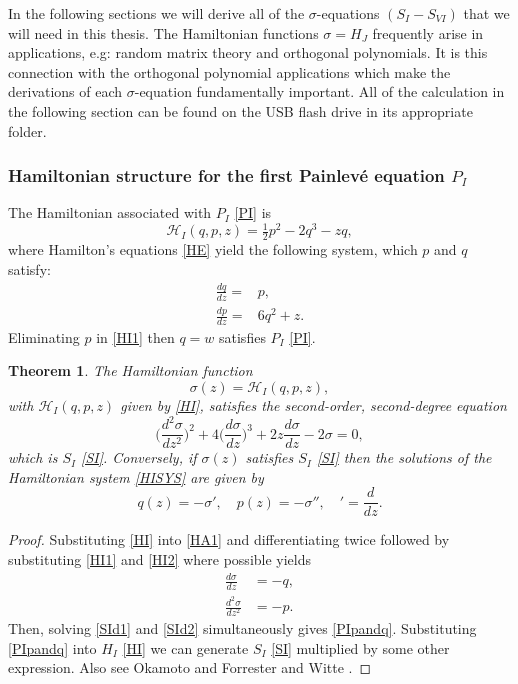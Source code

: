 \documentclass[12pt]{article}
\def\P{Painlev\'e }
\newtheorem{mydef}{Theorem}[section]
\numberwithin{figure}{section}
\numberwithin{equation}{section}
\numberwithin{table}{section}
\begin{document}
In the following sections we will derive all of the $\sigma$-equations $(S_I - S_{VI})$ that we will need in this thesis. The Hamiltonian functions $\sigma = H_J$ frequently arise in applications, e.g:
random matrix theory and orthogonal polynomials. It is this connection with the orthogonal polynomial applications which make the derivations of each $\sigma$-equation fundamentally important. All of the calculation in the following section can be found on the USB flash drive in its appropriate folder.
\subsubsection{Hamiltonian structure for the first \P equation $P_{I}$}
The Hamiltonian associated with $P_{I}$ \eqref{PI} is
\begin{equation}
\mathcal{H}_{I}(q,p,z) = \tfrac{1}{2}p^2-2q^3-zq,\label{HI}
\end{equation}
where Hamilton's equations \eqref{HE} yield the following system, which $p$ and $q$ satisfy:
\begin{subequations}\label{HISYS}
\begin{align}
\frac{dq}{dz}=&p,\label{HI1}\\
\frac{dp}{dz}=&6q^2+z.\label{HI2}
\end{align}
\end{subequations}
Eliminating $p$ in \eqref{HI1} then $q=w$ satisfies $P_I$ \eqref{PI}.
\begin{mydef} The Hamiltonian function
\begin{equation}
\sigma(z)=\mathcal{H}_{I}(q,p,z),\label{HA1}
\end{equation}
with $\mathcal{H}_I(q,p,z)$ given by \eqref{HI}, satisfies the second-order, second-degree equation
$$
\bigg(\frac{d^2\sigma}{dz^2}\bigg)^2+4\bigg(\frac{d\sigma}{dz}\bigg)^3+2z\frac{d\sigma}{dz}-2\sigma=0,
$$
which is $S_{I}$ \eqref{SI}.
Conversely, if $\sigma(z)$ satisfies $S_I$ \eqref{SI} then the solutions of the Hamiltonian system \eqref{HISYS} are given by
\begin{equation}\label{PIpandq}
q(z)=-\sigma',\quad
p(z)=-\sigma'',\quad'=\frac{d}{dz}.
\end{equation}
\end{mydef}
\begin{proof}
Substituting \eqref{HI} into \eqref{HA1} and differentiating twice followed by substituting \eqref{HI1} and \eqref{HI2} where possible yields
\begin{subequations}
\begin{align}
\frac{d\sigma}{dz} &=-q,\label{SId1}\\
\frac{d^2\sigma}{dz^2} &=-p.\label{SId2}
\end{align}
\end{subequations}
Then, solving \eqref{SId1} and \eqref{SId2} simultaneously gives \eqref{PIpandq}.
Substituting \eqref{PIpandq} into $H_{I}$ \eqref{HI} we can generate $S_{I}$ \eqref{SI} multiplied by some other expression.
Also see Okamoto \cite{P:56:264,P:30:305} and Forrester and Witte \cite{P:57:679}.
\end{proof}
\end{document}
